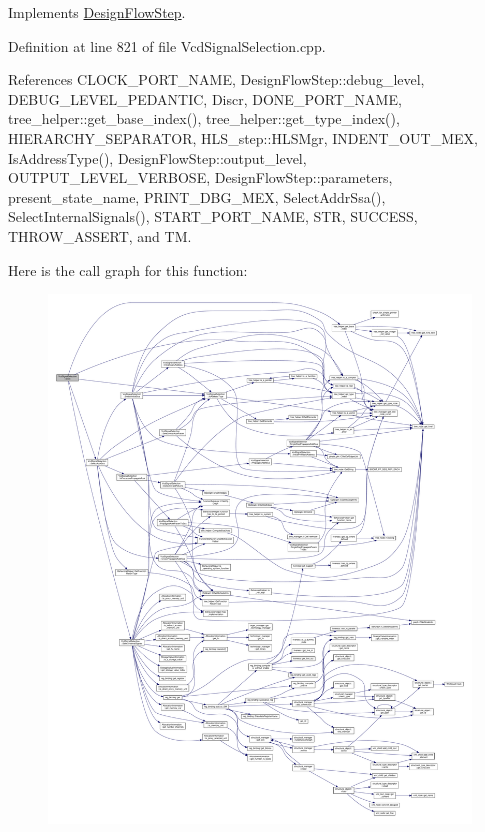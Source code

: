 Implements \hyperlink{classDesignFlowStep_a77d7e38493016766098711ea24f60b89}{Design\+Flow\+Step}.



Definition at line 821 of file Vcd\+Signal\+Selection.\+cpp.



References C\+L\+O\+C\+K\+\_\+\+P\+O\+R\+T\+\_\+\+N\+A\+ME, Design\+Flow\+Step\+::debug\+\_\+level, D\+E\+B\+U\+G\+\_\+\+L\+E\+V\+E\+L\+\_\+\+P\+E\+D\+A\+N\+T\+IC, Discr, D\+O\+N\+E\+\_\+\+P\+O\+R\+T\+\_\+\+N\+A\+ME, tree\+\_\+helper\+::get\+\_\+base\+\_\+index(), tree\+\_\+helper\+::get\+\_\+type\+\_\+index(), H\+I\+E\+R\+A\+R\+C\+H\+Y\+\_\+\+S\+E\+P\+A\+R\+A\+T\+OR, H\+L\+S\+\_\+step\+::\+H\+L\+S\+Mgr, I\+N\+D\+E\+N\+T\+\_\+\+O\+U\+T\+\_\+\+M\+EX, Is\+Address\+Type(), Design\+Flow\+Step\+::output\+\_\+level, O\+U\+T\+P\+U\+T\+\_\+\+L\+E\+V\+E\+L\+\_\+\+V\+E\+R\+B\+O\+SE, Design\+Flow\+Step\+::parameters, present\+\_\+state\+\_\+name, P\+R\+I\+N\+T\+\_\+\+D\+B\+G\+\_\+\+M\+EX, Select\+Addr\+Ssa(), Select\+Internal\+Signals(), S\+T\+A\+R\+T\+\_\+\+P\+O\+R\+T\+\_\+\+N\+A\+ME, S\+TR, S\+U\+C\+C\+E\+SS, T\+H\+R\+O\+W\+\_\+\+A\+S\+S\+E\+RT, and TM.

Here is the call graph for this function\+:
\nopagebreak
\begin{figure}[H]
\begin{center}
\leavevmode
\includegraphics[width=350pt]{dd/de4/classVcdSignalSelection_a330bc0d127f30a23cb4c8224855f0c27_cgraph}
\end{center}
\end{figure}
\mbox{\label{classVcdSignalSelection_afa06729c43cc2aa50e1fb3ed25d5b239}} 
